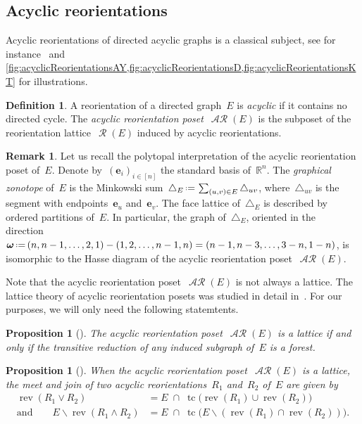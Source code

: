 \documentclass{amsart}
\newtheorem{proposition}[theorem]{Proposition}
\theoremstyle{definition}
\newtheorem{definition}[theorem]{Definition}
\newtheorem{remark}[theorem]{Remark}
\newcommand{\R}{\mathbb{R}} %
\renewcommand{\b}[1]{\boldsymbol{#1}} %
\renewcommand{\c}[1]{\mathcal{#1}} %
\newcommand{\ssm}{\smallsetminus} %
\newcommand{\eqdef}{\mbox{\,\raisebox{0.2ex}{\scriptsize\ensuremath{\mathrm:}}\ensuremath{=}\,}} %
\newcommand{\simplex}{\triangle} %
\DeclareMathOperator{\tc}{tc} %
\newcommand{\darkblue}{\color{darkblue}} %
\newcommand{\defn}[1]{\textsl{\darkblue #1}} %
\newcommand{\meet}{\wedge} %
\newcommand{\join}{\vee} %
\DeclareMathOperator{\Reori}{\c{R}}  %
\DeclareMathOperator{\AReori}{\c{AR}}  %
\DeclareMathOperator{\rev}{rev} %
\begin{document}
\subsection{Acyclic reorientations}
\label{subsec:acyclicReorientations}

Acyclic reorientations of directed acyclic graphs is a classical subject, see for instance~\cite{Greene,GreeneZaslavsky,Pilaud-acyclicReorientationLattices} and \cref{fig:acyclicReorientationsAY,fig:acyclicReorientationsD,fig:acyclicReorientationsKT} for illustrations.

\begin{definition}
\label{def:AReori}
A reorientation of a directed graph~$E$ is \defn{acyclic} if it contains no directed cycle.
The \defn{acyclic reorientation poset}~$\AReori(E)$ is the subposet of the reorientation lattice~$\Reori(E)$ induced by acyclic reorientations.
\end{definition}

\begin{remark}
Let us recall the polytopal interpretation of the acyclic reorientation poset of~$E$.
Denote by~$(\b{e}_i)_{i \in [n]}$ the standard basis of~$\R^n$.
The \defn{graphical zonotope} of~$E$ is the Minkowski sum~$\simplex_E \eqdef \sum_{(u,v) \in E} \simplex_{uv}$, where~$\simplex_{uv}$ is the segment with endpoints~$\b{e}_u$ and~$\b{e}_v$.
The face lattice of~$\simplex_E$ is described by ordered partitions of~$E$.
In particular, the graph of~$\simplex_E$, oriented in the direction~$\b{\omega} \eqdef (n, n-1, \dots, 2, 1) - (1, 2, \dots, n-1, n) = (n-1, n-3, \dots, 3-n, 1-n)$, is isomorphic to the Hasse diagram of the acyclic reorientation poset~$\AReori(E)$.
\end{remark}

Note that the acyclic reorientation poset~$\AReori(E)$ is not always a lattice.
The lattice theory of acyclic reorientation posets was studied in detail in~\cite{Pilaud-acyclicReorientationLattices}.
For our purposes, we will only need the following statemtents.

\begin{proposition}[{\cite[Thm.~1]{Pilaud-acyclicReorientationLattices}}]
\label{prop:AReoriLat}
The acyclic reorientation poset~$\AReori(E)$ is a lattice if and only if the transitive reduction of any induced subgraph of~$E$ is a forest.
\end{proposition}

\begin{proposition}[{\cite[Thm.~9]{Pilaud-acyclicReorientationLattices}}]
\label{prop:AReoriLatJoinMeet}
When the acyclic reorientation poset~$\AReori(E)$ is a lattice, the meet and join of two acyclic reorientations~$R_1$ and~$R_2$ of~$E$ are given by
\begin{align*}
\rev(R_1 \join R_2) & = E \;\cap\; \tc \!\big( \rev(R_1) \cup \rev(R_2) \big) \\
\text{and}\qquad
E \ssm \rev(R_1 \meet R_2) & = E \;\cap\; \tc \!\big( E \ssm (\rev(R_1) \cap \rev(R_2)) \big).
\end{align*}
\end{proposition}
\end{document}

